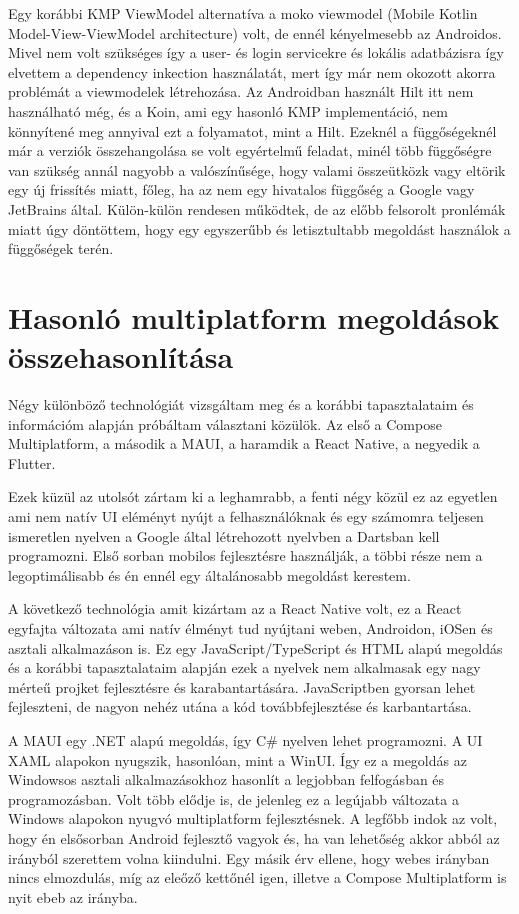 Egy korábbi KMP ViewModel alternatíva a moko viewmodel (Mobile Kotlin Model-View-ViewModel architecture) volt, de ennél kényelmesebb az Androidos.
Mivel nem volt szükséges így a user- és login servicekre és lokális adatbázisra így elvettem a dependency inkection használatát, mert így már nem okozott akorra problémát a viewmodelek létrehozása. Az Androidban használt Hilt itt nem használható még, és a Koin, ami egy hasonló KMP implementáció, nem könnyítené meg annyival ezt a folyamatot, mint a Hilt.
Ezeknél a függőségeknél már a verziók összehangolása se volt egyértelmű feladat, minél több függőségre van szükség annál nagyobb a valószínűsége, hogy valami összeütközk vagy eltörik egy új frissítés miatt, főleg, ha az nem egy hivatalos függőség a Google vagy JetBrains által.
Külön-külön rendesen működtek, de az előbb felsorolt pronlémák miatt úgy döntöttem, hogy egy egyszerűbb és letisztultabb megoldást használok a függőségek terén.

\section{Hasonló multiplatform megoldások összehasonlítása}
\label{sec:SimilarSolutions}

Négy különböző technológiát vizsgáltam meg és a korábbi tapasztalataim és információm alapján próbáltam választani közülök.
Az első a Compose Multiplatform, a második a MAUI, a haramdik a React Native, a negyedik a Flutter.

Ezek küzül az utolsót zártam ki a leghamrabb, a fenti négy közül ez az egyetlen ami nem natív UI eléményt nyújt a felhasználóknak és egy számomra teljesen ismeretlen nyelven a Google által létrehozott nyelvben a Dartsban kell programozni.
Első sorban mobilos fejlesztésre használják, a többi része nem a legoptimálisabb és én ennél egy általánosabb megoldást kerestem. \cite{Flutter}

A következő technológia amit kizártam az a React Native volt, ez a React egyfajta változata ami natív élményt tud nyújtani weben, Androidon, iOSen és asztali alkalmazáson is.
Ez egy JavaScript/TypeScript és HTML alapú megoldás és a korábbi tapasztalataim alapján ezek a nyelvek nem alkalmasak egy nagy mérteű projket fejlesztésre és karabantartására. 
JavaScriptben gyorsan lehet fejleszteni, de nagyon nehéz utána a kód továbbfejlesztése és karbantartása. \cite{ReactNative}

A MAUI egy .NET alapú megoldás, így C\# nyelven lehet programozni. A UI XAML alapokon nyugszik, hasonlóan, mint a WinUI.
Így ez a megoldás az Windowsos asztali alkalmazásokhoz hasonlít a legjobban felfogásban és programozásban.
Volt több elődje is, de jelenleg ez a legújabb változata a Windows alapokon nyugvó multiplatform fejlesztésnek.
A legfőbb indok az volt, hogy én elsősorban Android fejlesztő vagyok és, ha van lehetőség akkor abból az irányból szerettem volna kiindulni.
Egy másik érv ellene, hogy webes irányban nincs elmozdulás, míg az eleőző kettőnél igen, illetve a Compose Multiplatform is nyit ebeb az irányba. \cite{MAUI} 

